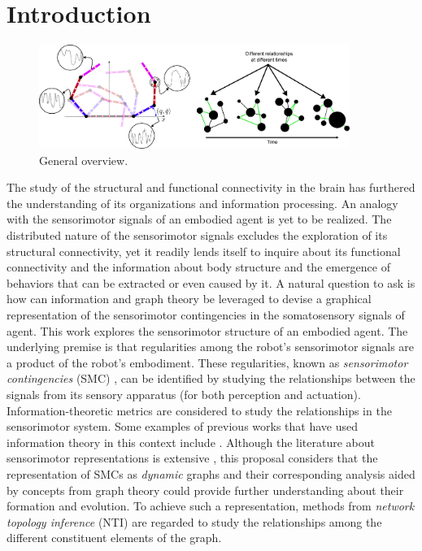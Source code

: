 \section{Introduction}\label{sec:intro}
\begin{figure}[!ht]
	\centering
	\includegraphics[width=0.9\textwidth]{dfc_concept_art.pdf}
	\caption{General overview.}
	\label{fig:general_overview}
\end{figure}
The study of the structural and functional connectivity in the brain has furthered the understanding of its organizations and information processing. An analogy with the sensorimotor signals of an embodied agent is yet to be realized. The distributed nature of the sensorimotor signals excludes the exploration of its structural connectivity, yet it readily lends itself to inquire about its functional connectivity and the information about body structure and the emergence of behaviors that can be extracted or even caused by it. 
A natural question to ask is how can information and graph theory be leveraged to devise a graphical representation of the sensorimotor contingencies in the somatosensory signals of agent. This work explores the sensorimotor structure of an embodied agent. The underlying premise is that regularities among the robot's sensorimotor signals are a product of the robot’s embodiment. These regularities, known as \emph{sensorimotor contingencies} (SMC) \cite{Jacquey2019Sensorimotorcontingenciesas}, can be identified by studying the relationships between the signals from its sensory apparatus (for both perception and actuation). Information-theoretic metrics are considered to study the relationships in the sensorimotor system. Some examples of previous works that have used information theory in this context include  \cite{Schmidt2013Bootstrappingperceptionusing,Lungarella2006Mappinginformationflow,Polani2009Modelsinformationprocessing,Bossomaier2016introductiontransferentropy,Olsson2006unknownsensorsactuators}. Although the literature about sensorimotor representations is extensive \cite{Nguyen2021Sensorimotorrepresentationlearning}, this proposal considers that the representation of SMCs as \emph{dynamic} graphs and their corresponding analysis aided by concepts from graph theory could provide further understanding about their formation and evolution. To achieve such a representation, methods from \emph{network topology inference} (NTI)\cite{Dong2019Learninggraphsdata} are regarded to study the relationships among the different constituent elements of the graph.

